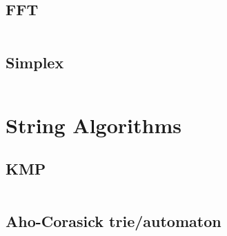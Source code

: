 \documentclass[a4paper]{article}
\begin{document}

  \subsection{FFT}
  \inputminted{cpp}{src/math_fft.cpp}

  \subsection{Simplex}
  \inputminted{cpp}{src/math_simplex.cpp}

  \section{String Algorithms}

  \subsection{KMP}
  \inputminted{cpp}{src/kmp.cpp}

  \subsection{Aho-Corasick trie/automaton}
  \inputminted{cpp}{src/ac-automation.cpp}



  
\end{document}
